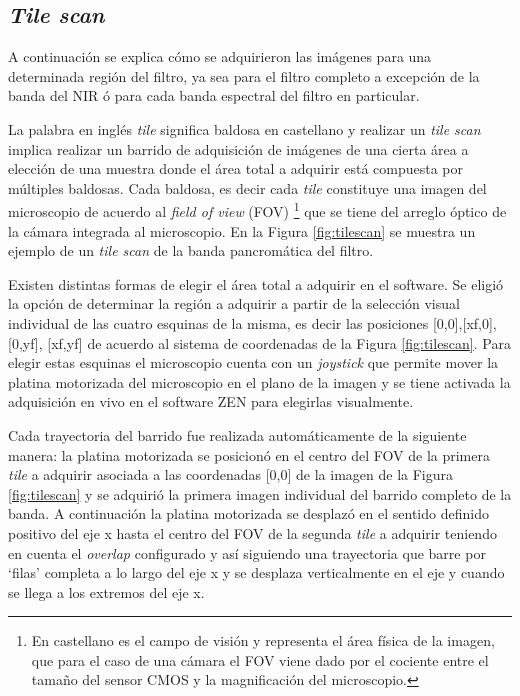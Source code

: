 \singlespacing
\subsection{\textit{Tile scan}}

\hspace{0.5cm}A continuación se explica cómo se adquirieron las imágenes para una determinada región del filtro, ya sea para el filtro completo a excepción de la banda del NIR ó para cada banda espectral del filtro en particular.

La palabra en inglés \textit{tile} significa baldosa en castellano y realizar un \textit{tile scan} implica realizar un barrido de adquisición de imágenes de una cierta área a elección de una muestra donde el área total a adquirir está compuesta por múltiples baldosas. Cada baldosa, es decir cada \textit{tile} constituye una imagen del microscopio de acuerdo al \textit{field of view} (FOV) \footnote{En castellano es el campo de visión y representa el área física de la imagen, que para el caso de una cámara el FOV viene dado por el cociente entre el tamaño del sensor CMOS y la magnificación del microscopio.} que se tiene del arreglo óptico de la cámara integrada al microscopio. En la Figura \ref{fig:tilescan} se muestra un ejemplo de un \textit{tile scan} de la banda pancromática del filtro.

Existen distintas formas de elegir el área total a adquirir en el software. Se eligió la opción de determinar la región a adquirir a partir de la selección visual individual de las cuatro esquinas de la misma, es decir las posiciones [0,0],[xf,0],[0,yf], [xf,yf] de acuerdo al sistema de coordenadas de la Figura \ref{fig:tilescan}. Para elegir estas esquinas el microscopio cuenta con un \textit{joystick} que permite mover la platina motorizada del microscopio en el plano de la imagen y se tiene activada la adquisición en vivo en el software ZEN para elegirlas visualmente.

Cada trayectoria del barrido fue realizada automáticamente de la siguiente manera: la platina motorizada se posicionó en el centro del FOV de la primera \textit{tile} a adquirir asociada a las coordenadas [0,0] de la imagen de la Figura \ref{fig:tilescan} y se adquirió la primera imagen individual del barrido completo de la banda. A continuación la platina motorizada se desplazó en el sentido definido positivo del eje x hasta el centro del FOV de la segunda \textit{tile} a adquirir teniendo en cuenta el \textit{overlap} configurado y así siguiendo una trayectoria que barre por `filas' completa a lo largo del eje x y se desplaza verticalmente en el eje y cuando se llega a los extremos del eje x.

